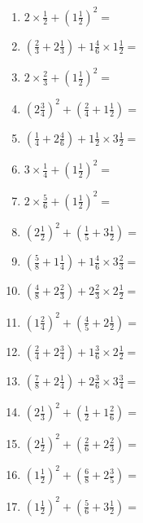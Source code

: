 \documentclass[12pt]{article}
\begin{document}
\begin{enumerate}
\item \large $ 2 \times \frac{1}{2} + (1 \frac{1}{2})^2 = $ \vspace{1.8cm}
\item \large $ (\frac{2}{3} + 2 \frac{1}{3}) + 1 \frac{4}{6} \times 1 \frac{1}{2} = $ \vspace{1.8cm}
\item \large $ 2 \times \frac{2}{3} + (1 \frac{1}{2})^2 = $ \vspace{1.8cm}
\item \large $ (2 \frac{3}{4})^2 + (\frac{2}{4} + 1 \frac{1}{2}) = $ \vspace{1.8cm}
\item \large $ (\frac{1}{4} + 2 \frac{4}{6}) + 1 \frac{1}{2} \times 3 \frac{1}{2} = $ \vspace{1.8cm}
\item \large $ 3 \times \frac{1}{4} + (1 \frac{1}{2})^2 = $ \vspace{1.8cm}
\item \large $ 2 \times \frac{5}{6} + (1 \frac{1}{2})^2 = $ \vspace{1.8cm}
\newpage
\item \large $ (2 \frac{1}{2})^2 + (\frac{1}{5} + 3 \frac{1}{2}) = $ \vspace{1.8cm}
\item \large $ (\frac{5}{8} + 1 \frac{1}{4}) + 1 \frac{4}{6} \times 3 \frac{2}{3} = $ \vspace{1.8cm}
\item \large $ (\frac{4}{8} + 2 \frac{2}{3}) + 2 \frac{2}{3} \times 2 \frac{1}{2} = $ \vspace{1.8cm}
\item \large $ (1 \frac{2}{4})^2 + (\frac{4}{5} + 2 \frac{1}{2}) = $ \vspace{1.8cm}
\item \large $ (\frac{2}{4} + 2 \frac{3}{4}) + 1 \frac{3}{6} \times 2 \frac{1}{2} = $ \vspace{1.8cm}
\item \large $ (\frac{7}{8} + 2 \frac{1}{4}) + 2 \frac{3}{6} \times 3 \frac{3}{4} = $ \vspace{1.8cm}
\item \large $ (2 \frac{1}{3})^2 + (\frac{1}{2} + 1 \frac{2}{6}) = $ \vspace{1.8cm}
\item \large $ (2 \frac{1}{2})^2 + (\frac{2}{6} + 2 \frac{2}{3}) = $ \vspace{1.8cm}
\item \large $ (1 \frac{1}{2})^2 + (\frac{6}{8} + 2 \frac{3}{5}) = $ \vspace{1.8cm}
\item \large $ (1 \frac{1}{2})^2 + (\frac{5}{6} + 3 \frac{1}{2}) = $ \vspace{1.8cm}
\end{enumerate}\newpage
\end{document}
